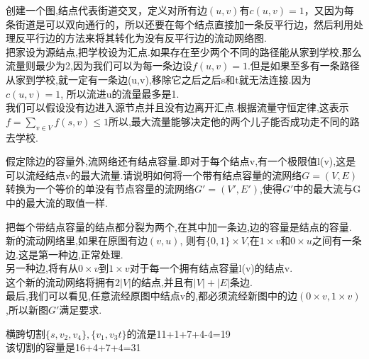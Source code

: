 \documentclass[a4paper, justified]{tufte-handout}
\begin{document}
\begin{solution}
  创建一个图,结点代表街道交叉，定义对所有边$(u,v)$有$c(u,v)=1$，又因为每条街道是可以双向通行的，所以还要在每个结点直接加一条反平行边，然后利用处理反平行边的方法来将其转化为没有反平行边的流动网络图.\\
  把家设为源结点,把学校设为汇点.如果存在至少两个不同的路径能从家到学校,那么流量则最少为2,因为我们可以为每一条边设$f(u,v)=1$.但是如果至多有一条路径从家到学校,就一定有一条边(u,v),移除它之后之后s和t就无法连接.因为$c(u,v)=1$, 所以流进u的流量最多是1.\\
  我们可以假设没有边进入源节点并且没有边离开汇点.根据流量守恒定律,这表示$f=\sum_{v\in V}f(s,v)\leq 1$所以,最大流量能够决定他的两个儿子能否成功走不同的路去学校.
\end{solution}

\begin{problem}[TC 26.1-7]
假定除边的容量外,流网络还有结点容量.即对于每个结点v,有一个极限值l(v),这是可以流经结点v的最大流量.请说明如何将一个带有结点容量的流网络$G=(V,E)$转换为一个等价的单没有节点容量的流网络$G'=(V',E')$,使得$G'$中的最大流与G中的最大流的取值一样.
\end{problem}

\begin{solution}
  把每个带结点容量的结点都分裂为两个,在其中加一条边,边的容量是结点的容量.\\
  新的流动网络里,如果在原图有边$(v,u)$, 则有$\{0,1\}\times V$,在$1\times v$和$0\times u$之间有一条边.这是第一种边,正常处理.\\
  另一种边,将有从$0\times v$到$1 \times v$对于每一个拥有结点容量l(v)的结点v.\\
  这个新的流动网络将拥有$2|V|$的结点,并且有$|V|+|E|$条边.\\
  最后,我们可以看见,任意流经原图中结点v的,都必须流经新图中的边$(0\times v,1 \times v)$,所以新图$G'$满足要求.
\end{solution}

\begin{problem}[TC 26.2-2]
\end{problem}

\begin{solution}
  横跨切割$\{s,v_2,v_4\},\{v_1,v_3t\}$的流是11+1+7+4-4=19\\
  该切割的容量是16+4+7+4=31
\end{solution}

\begin{problem}[TC 26.2-6]
\end{problem}
\end{document}
